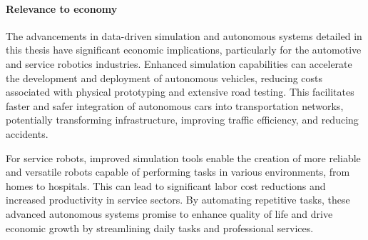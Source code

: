 \paragraph{Relevance to economy}
The advancements in data-driven simulation and autonomous systems detailed in this thesis have significant economic implications, particularly for the automotive and service robotics industries. Enhanced simulation capabilities can accelerate the development and deployment of autonomous vehicles, reducing costs associated with physical prototyping and extensive road testing. This facilitates faster and safer integration of autonomous cars into transportation networks, potentially transforming infrastructure, improving traffic efficiency, and reducing accidents.

For service robots, improved simulation tools enable the creation of more reliable and versatile robots capable of performing tasks in various environments, from homes to hospitals. This can lead to significant labor cost reductions and increased productivity in service sectors. By automating repetitive tasks, these advanced autonomous systems promise to enhance quality of life and drive economic growth by streamlining daily tasks and professional services.